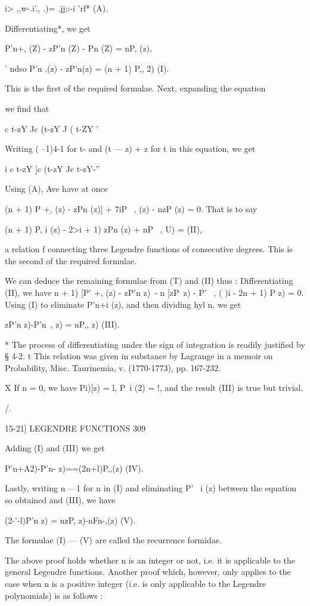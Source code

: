 {i> ,,w-.i'., .)= .jj;:-i 'rf* (A).

Differentiating*, we get

P'n+, (Z) - zP'n (Z) - Pn (Z) = nP, (z),

' ndso P'n ,(z) - zP'n(z) = (n + 1) P,, 2) (I).

This is the first of the required formulae. Next, expanding the
equation

we find that

c t-zY Jc (t-zY J ( t-ZY '

Writing ( --1)4-1 for t- and (t — z) + z for t in this equation, we
get

 i c t-zY ]c (t-zY Jc t-zY-''

Using (A), Ave have at once

(n + 1) P +, (z) - zPn (z)] + 7iP \ , (z) - nzP (z) = 0. That is to
say

(n + 1) P, i (z) - 2>i + 1) zPn (z) + nP \ , U) = (II),

a relation f connecting three Legendre functions of consecutive
degrees. This is the second of the required formulae.

We can deduce the remaining formulae from (T) and (II) thus :
Differentiating (II), we have n + 1) [P' +, (z) - zP'n z)\ - n [zP\ z)
- P' \ , ( )i - 2n + 1) P z) = 0. Using (I) to eliminate P'n+i (z),
and then dividing hyl n, we get

zP'n z)-P'n\ , z) = nP,, z) (III).

* The process of differentiating under the sign of integration is
readily justified by § 4-2. t This relation was given in substance by
Lagrange in a memoir on Probability, Misc. Taurinemia, v. (1770-1773),
pp. 167-232.

X If n = 0, we have Pi)[z) = l, P\ i (2) = !, and the result (III) is
true but trivial.

/.

15-21] LEGENDRE FUNCTIONS 309

Adding (I) and (III) we get

P'n+A2)-P'n- z)==(2n+l)P,,(z) (IV).

Lastly, writing n —1 for n in (I) and eliminating P' \ i (z) between
the equation so obtained and (III), we have

(2-'-l)P'n z) = nzP, z)-nFn-,(z) (V).

The formulae (I) — (V) are called the recurrence formidae.

The above proof holds whether n is an integer or not, i.e. it is
applicable to the general Legendre functions. Another proof which,
however, only applies to the case when n is a positive integer (i.e.
is only applicable to the Legendre polynomials) is as follows :

}
